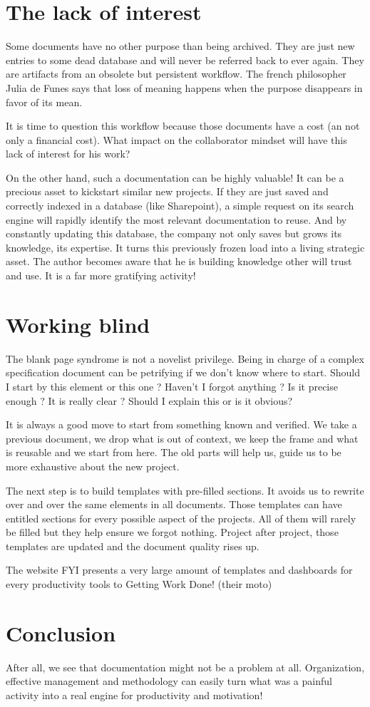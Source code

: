 \section{The lack of interest}
Some documents have no other purpose than being archived. They are just new entries to some dead database and will never be referred back to ever again. They are artifacts from an obsolete but persistent workflow. The french philosopher Julia de Funes says that loss of meaning happens when the purpose disappears in favor of its mean.

It is time to question this workflow because those documents have a cost (an not only a financial cost). What impact on the collaborator mindset will have this lack of interest for his work?

On the other hand, such a documentation can be highly valuable! It can be a precious asset to kickstart similar new projects. If they are just saved and correctly indexed in a database (like Sharepoint), a simple request on its search engine will rapidly identify the most relevant documentation to reuse. And by constantly updating this database, the company not only saves but grows its knowledge, its expertise. It turns this previously frozen load into a living strategic asset. The author becomes aware that he is building knowledge other will trust and use. It is a far more gratifying activity!

\section{Working blind}
The blank page syndrome is not a novelist privilege. Being in charge of a complex specification document can be petrifying if we don’t know where to start. Should I start by this element or this one ? Haven’t I forgot anything ? Is it precise enough ? It is really clear ? Should I explain this or is it obvious?

It is always a good move to start from something known and verified. We take a previous document, we drop what is out of context, we keep the frame and what is reusable and we start from here. The old parts will help us, guide us to be more exhaustive about the new project.

The next step is to build templates with pre-filled sections. It avoids us to rewrite over and over the same elements in all documents. Those templates can have entitled sections for every possible aspect of the projects. All of them will rarely be filled but they help ensure we forgot nothing. Project after project, those templates are updated and the document quality rises up.

The website FYI presents a very large amount of templates and dashboards for every productivity tools to Getting Work Done! (their moto)

\section{Conclusion}
After all, we see that documentation might not be a problem at all. Organization, effective management and methodology can easily turn what was a painful activity into a real engine for productivity and motivation!

